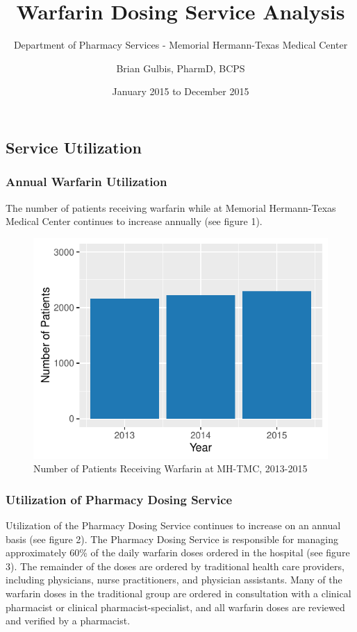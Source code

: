 \documentclass[]{article}
\title{Warfarin Dosing Service Analysis}
\subtitle{Department of Pharmacy Services - Memorial Hermann-Texas Medical Center}
\author{Brian Gulbis, PharmD, BCPS}
\date{January 2015 to December 2015}
\begin{document}
\maketitle

\subsection{Service Utilization}\label{service-utilization}

\subsubsection{Annual Warfarin
Utilization}\label{annual-warfarin-utilization}

The number of patients receiving warfarin while at Memorial
Hermann-Texas Medical Center continues to increase annually (see figure
1).

\begin{figure}[H]
\centering
\includegraphics{warfarin_analysis_2015_files/figure-latex/graph_utilization-1.pdf}
\caption{Number of Patients Receiving Warfarin at MH-TMC, 2013-2015}
\end{figure}

\subsubsection{Utilization of Pharmacy Dosing
Service}\label{utilization-of-pharmacy-dosing-service}

Utilization of the Pharmacy Dosing Service continues to increase on an
annual basis (see figure 2). The Pharmacy Dosing Service is responsible
for managing approximately 60\% of the daily warfarin doses ordered in
the hospital (see figure 3). The remainder of the doses are ordered by
traditional health care providers, including physicians, nurse
practitioners, and physician assistants. Many of the warfarin doses in
the traditional group are ordered in consultation with a clinical
pharmacist or clinical pharmacist-specialist, and all warfarin doses are
reviewed and verified by a pharmacist.
\end{document}
